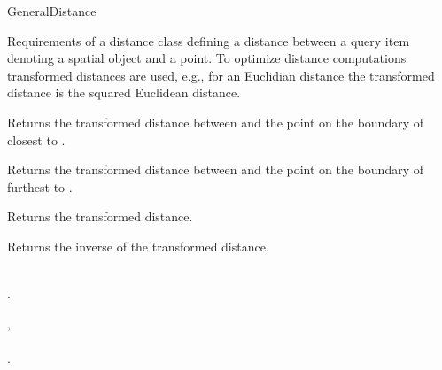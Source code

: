 

\begin{ccRefConcept}{GeneralDistance}


\ccDefinition

Requirements of a distance class defining a distance between a query item
denoting a spatial object and a point.
To optimize distance computations transformed distances are used,
e.g., for an Euclidian distance the transformed distance is the squared Euclidean distance.


\ccTypes



\ccOperations


{Returns the transformed distance between  and
the point on the boundary of  closest to .}

{Returns the transformed distance between  and
the point on the boundary of  furthest to .}

 {Returns the transformed distance.}

 {Returns the inverse of the transformed distance.}

\ccHasModels

\\
.

\ccSeeAlso

,\\
\\
.

\end{ccRefConcept}


